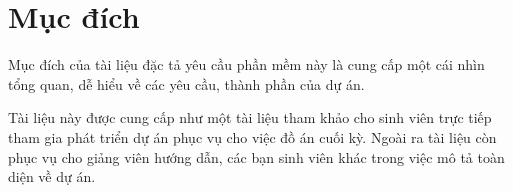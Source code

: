\section{Mục đích}
Mục đích của tài liệu đặc tả yêu cầu phần mềm này là cung cấp một cái nhìn tổng quan, dễ hiểu về các yêu cầu, thành phần của dự án.

Tài liệu này được cung cấp như một tài liệu tham khảo cho sinh viên trực tiếp tham gia
phát triển dự án phục vụ cho việc đồ án cuối kỳ. Ngoài ra tài liệu còn phục vụ cho giảng viên hướng dẫn, các bạn sinh viên khác trong việc mô tả toàn diện về dự án.